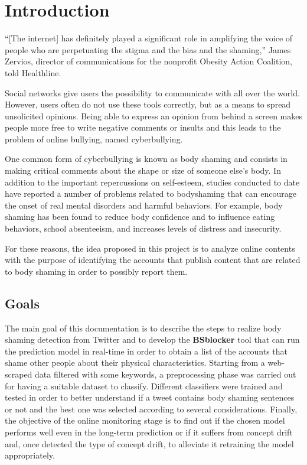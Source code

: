 \section{Introduction}

“[The internet] has definitely played a significant role in amplifying the voice of people who are perpetuating the stigma and the bias and the shaming,” James Zervios, director of communications for the nonprofit Obesity Action Coalition, told Healthline. \cite{healthline}

Social networks give users the possibility to communicate with all over the world.
However, users often do not use these tools correctly, but as a means to spread unsolicited opinions. Being able to express an opinion from behind a screen makes people more free to write negative comments or insults and this leads to the problem of online bullying, named cyberbullying.

One common form of cyberbullying is known as body shaming and consists in making critical comments about the shape or size of someone else's body.
In addition to the important repercussions on self-esteem, studies conducted to date have reported a number of problems related to bodyshaming that can encourage the onset of real mental disorders and harmful behaviors. For example, body shaming has been found to reduce body confidence and to influence eating behaviors, school absenteeism, and increases levels of distress and insecurity. \cite{disorders}


For these reasons, the idea proposed in this project is to analyze online contents with the purpose of identifying the accounts that publish content that are related to body shaming in order to possibly report them.

\subsection{Goals}
The main goal of this documentation is to describe the steps to realize body shaming detection from Twitter and to develop the \textbf{BSblocker} tool that can run the prediction model in real-time in order to obtain a list of the accounts that shame other people about their physical characteristics.
Starting from a web-scraped data filtered with some keywords, a preprocessing phase was carried out for having a suitable dataset to classify. Different classifiers were trained and tested in order to better understand if a tweet contains body shaming sentences or not and the best one was selected according to several considerations.
Finally, the objective of the online monitoring stage is to find out if the chosen model performs well even in the long-term prediction or if it suffers from concept drift and, once detected the type of concept drift, to alleviate it retraining the model appropriately.
